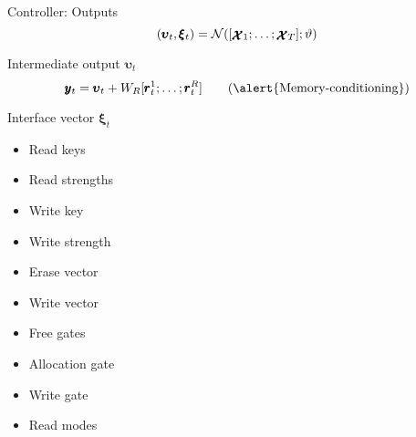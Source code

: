 \documentclass{beamer}
\newcommand{\xx}{\pmb{\raisebox{-1.5pt}{$\mathcal{X}$}}}
\begin{document}
\begin{frame}{Controller: Outputs}
	\[
	(\pmb{\upsilon}_t,\pmb{\xi}_t)=\mathcal{N}([\xx_1;\dots;\xx_T];\vartheta)
	\]
	\vspace{5pt}
	
	\pause
	\alert{Intermediate output} $\pmb{\upsilon}_t$
	\[
	\pmb{y}_t = \pmb{\upsilon}_t + W_R[\pmb{r}_t^1;\dots;\pmb{r}_t^R] \tag{\alert{Memory-conditioning}}
	\]
	
	\pause
	\alert{Interface vector} $\pmb\xi_t$
	
	\begin{minipage}{0.49\textwidth}
	\begin{itemize}
		\item Read keys %
		\item Read strengths %
		\item Write key %
		\item Write strength %
		\item Erase vector %
	\end{itemize}
	\end{minipage}
	\begin{minipage}{0.49\textwidth}
	\begin{itemize}
		\item Write vector %
		\item Free gates %
		\item Allocation gate %
		\item Write gate %
		\item Read modes %
	\end{itemize}
	\end{minipage}
\end{frame}
\end{document}
